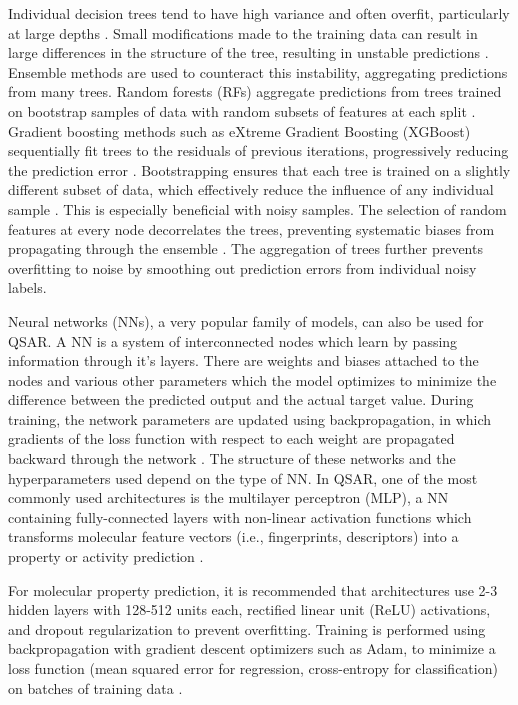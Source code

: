 Individual decision trees tend to have high variance and often overfit, particularly at large depths \citep{Breiman1984}. Small modifications made to the training data can result in large differences in the structure of the tree, resulting in unstable predictions \citep{Breiman2001}. Ensemble methods are used to counteract this instability, aggregating predictions from many trees. Random forests (RFs) aggregate predictions from trees trained on bootstrap samples of data with random subsets of features at each split \citep{Breiman2001}. Gradient boosting methods such as eXtreme Gradient Boosting (XGBoost) sequentially fit trees to the residuals of previous iterations, progressively reducing the prediction error \citep{Chen2016}. Bootstrapping ensures that each tree is trained on a slightly different subset of data, which effectively reduce the influence of any individual sample \citep{Breiman2001}. This is especially beneficial with noisy samples. The selection of random features at every node decorrelates the trees, preventing systematic biases from propagating through the ensemble \citep{Breiman2001}. The aggregation of trees further prevents overfitting to noise by smoothing out prediction errors from individual noisy labels. 

Neural networks (NNs), a very popular family of models, can also be used for QSAR. A NN is a system of interconnected nodes which learn by passing information through it's layers. There are weights and biases attached to the nodes and various other parameters which the model optimizes to minimize the difference between the predicted output and the actual target value. During training, the network parameters are updated using backpropagation, in which gradients of the loss function with respect to each weight are propagated backward through the network \citep{Hornik1989}. The structure of these networks and the hyperparameters used depend on the type of NN. In QSAR, one of the most commonly used architectures is the multilayer perceptron (MLP), a NN containing fully-connected layers with non-linear activation functions which transforms molecular feature vectors (i.e., fingerprints, descriptors) into a property or activity prediction \citep{Ma2015}.

For molecular property prediction, it is recommended that architectures use 2-3 hidden layers with 128-512 units each, rectified linear unit (ReLU) activations, and dropout regularization to prevent overfitting. Training is performed using backpropagation with gradient descent optimizers such as Adam, to minimize a loss function (mean squared error for regression, cross-entropy for classification) on batches of training data \citep{wu2018}. 

